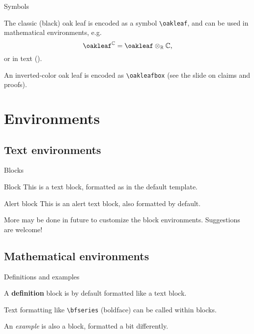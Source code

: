\documentclass{beamer}
\begin{document}
\begin{frame}[fragile]{Symbols}

The classic (black) oak leaf is encoded as a symbol \verb|\oakleaf|, and can be used in mathematical environments, e.g.
\[\oakleaf^{\mathbb{C}}=\oakleaf\otimes_{\mathbb{R}}\mathbb{C}\text,\]
or in text (\oakleaf).

An inverted-color oak leaf is encoded as \verb|\oakleafbox| (see the slide on claims and proofs).

\end{frame}


\section{Environments}


\subsection{Text environments}


\begin{frame}{Blocks}

\begin{block}{Block}
This is a text block, formatted as in the {\ttfamily default} template.
\end{block}

\begin{alertblock}{Alert block}
This is an alert text block, also formatted by default.
\end{alertblock}

More may be done in future to customize the block environments. Suggestions are welcome!

\end{frame}


\subsection{Mathematical environments}


\begin{frame}[fragile]{Definitions and examples}

\begin{definition}
A {\bfseries definition} block is by default formatted like a text block.
\end{definition}

Text formatting like \verb|\bfseries| (boldface) can be called within blocks.

\begin{example}
An \emph{example} is also a block, formatted a bit differently.
\end{example}

\end{frame}
\end{document}
